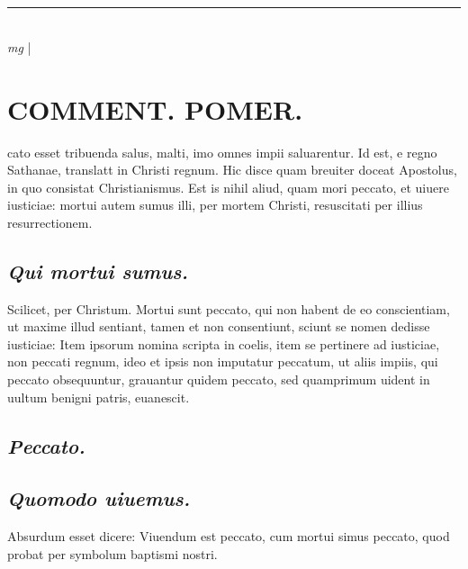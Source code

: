 \documentclass{article}
\begin{document}
\begin{pages}
\section*{}
\marginpar{[ p.]}\pstart  \pend
{}
{}
\subsection*{\textit{}}\pstart  \pend
\vspace{0.5cm}\noindent
\vspace{0.2cm}\rule{1cm}{0.2pt}\\ 
\hspace{0.2cm}\textit{mg}
\footnotesize 
\normalsize| 
\section*{COMMENT. POMER.  }\pstart cato esset tribuenda salus, malti, imo omnes impii saluarentur.  \pend\pstart Id est, e regno Sathanae, translatt in Christi regnum. Hic disce quam breuiter doceat Apostolus, in quo consistat Christianismus. Est is nihil aliud, quam mori peccato, et uiuere iusticiae: mortui autem sumus illi, per mortem Christi, resuscitati per illius resurrectionem.   \pend
{}
{}
\subsection*{\textit{Qui mortui sumus. }}\pstart Scilicet, per Christum. Mortui sunt peccato, qui non habent de eo conscientiam, ut maxime illud sentiant, tamen et non consentiunt, sciunt se nomen dedisse iusticiae: Item ipsorum nomina scripta in coelis, item se pertinere ad iusticiae, non peccati regnum, ideo et ipsis non imputatur peccatum, ut aliis impiis, qui peccato obsequuntur, grauantur quidem peccato, sed quamprimum uident in uultum benigni patris, euanescit.   \pend
{}
{}
\subsection*{\textit{Peccato. }}
{}
\subsection*{\textit{Quomodo uiuemus. }}\pstart Absurdum esset dicere: Viuendum est peccato, cum mortui simus peccato, quod probat per symbolum baptismi nostri.   \pend
{}
{}

\end{pages}
\end{document}
